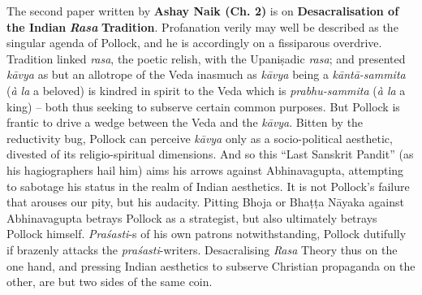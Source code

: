 The second paper written by {\bf Ashay Naik (Ch. 2)} is on {\bf Desacralisation of the Indian} {\sl\bfseries Rasa} {\bf Tradition}. Profanation verily may well be described as the singular agenda of Pollock, and he is accordingly on a fissiparous overdrive. Tradition linked \textsl{rasa}, the poetic relish, with the Upaniṣadic \textsl{rasa}; and presented \textsl{kāvya} as but an allotrope of the Veda inasmuch as \textsl{kāvya} being a \textsl{kāntā-sammita} (\textsl{à la} a beloved) is kindred in spirit to the Veda which is \textsl{prabhu-sammita} (\textsl{à la} a king) -- both thus seeking to subserve certain common purposes. But Pollock is frantic to drive a wedge between the Veda and the \textsl{kāvya}. Bitten by the reductivity bug, Pollock can perceive \textsl{kāvya} only as a socio-political aesthetic, divested of its religio-spiritual dimensions. And so this “Last Sanskrit Pandit” (as his hagiographers hail him) aims his arrows against Abhinavagupta, attempting to sabotage his status in the realm of Indian aesthetics. It is not Pollock's failure that arouses our pity, but his audacity. Pitting Bhoja or Bhaṭṭa Nāyaka against Abhinavagupta betrays Pollock as a strategist, but also ultimately betrays Pollock himself. \textsl{Praśasti}-s of his own patrons notwithstanding, Pollock dutifully if brazenly attacks the \textsl{praśasti}-writers. Desacralising \textsl{Rasa} Theory thus on the one hand, and pressing Indian aesthetics to subserve Christian propaganda on the other, are but two sides of the same coin.

